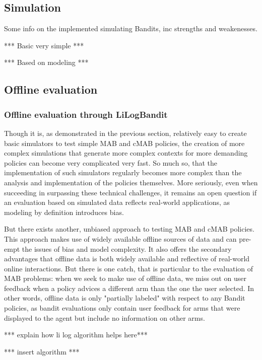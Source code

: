 \documentclass[nojss]{jss}\usepackage[]{graphicx}\usepackage[]{color}
\begin{document}
\subsection{Simulation}

Some info on the implemented simulating Bandits, inc strengths and weakenesses.

*** Basic very simple ***

*** Based on modeling ***

\subsection{Offline evaluation}

\subsubsection{Offline evaluation through LiLogBandit}

Though it is, as demonstrated in the previous section, relatively easy to create basic simulators to test simple MAB and cMAB policies, the creation of more complex simulations that generate more complex contexts for more demanding policies can become very complicated very fast. So much so, that the implementation of such simulators regularly becomes more complex than the analysis and implementation of the policies themselves. More seriously, even when succeeding in surpassing these technical challenges, it remains an open question if an evaluation based on simulated data reflects real-world applications, as modeling by definition introduces bias.

But there exists another, unbiased approach to testing MAB and cMAB policies. This approach makes use of widely available offline sources of data and can pre-empt the issues of bias and model complexity. It also offers the secondary advantages that offline data is both widely available and reflective of real-world online interactions. But there is one catch, that is particular to the evaluation of MAB problems: when we seek to make use of offline data, we miss out on user feedback when a policy advices a different arm than the one the user selected. In other words, offline data is only "partially labeled" with respect to any Bandit policies, as bandit evaluations only contain user feedback for arms that were displayed to the agent but include no information on other arms.

*** explain how li log algorithm helps here***

*** insert algorithm ***
\end{document}
